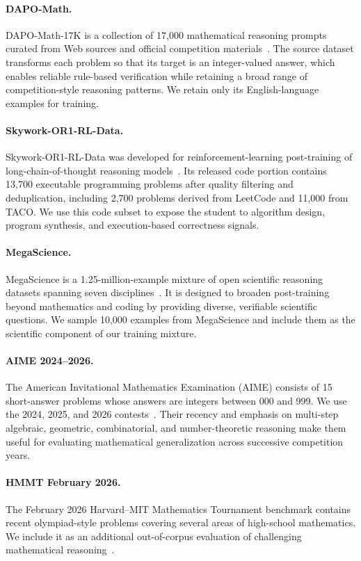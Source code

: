 \paragraph{DAPO-Math.}
DAPO-Math-17K is a collection of 17,000 mathematical reasoning prompts curated from Web sources and official competition materials~\citep{abs-2503-14476}. 
The source dataset transforms each problem so that its target is an integer-valued answer, which enables reliable rule-based verification while retaining a broad range of competition-style reasoning patterns. 
We retain only its English-language examples for training.

\paragraph{Skywork-OR1-RL-Data.}
Skywork-OR1-RL-Data was developed for reinforcement-learning post-training of long-chain-of-thought reasoning models~\citep{abs-2505-22312}.  
Its released code portion contains 13,700 executable programming problems after quality filtering and deduplication, including 2,700 problems derived from LeetCode and 11,000 from TACO\@. 
We use this code subset to expose the student to algorithm design, program synthesis, and execution-based correctness signals.

\paragraph{MegaScience.}
MegaScience is a 1.25-million-example mixture of open scientific reasoning datasets spanning seven disciplines~\citep{abs-2507-16812}. 
It is designed to broaden post-training beyond mathematics and coding by providing diverse, verifiable scientific questions. 
We sample 10,000 examples from MegaScience and include them as the scientific component of our training mixture.

\paragraph{AIME 2024--2026.}
The American Invitational Mathematics Examination (AIME) consists of 15 short-answer problems whose answers are integers between 000 and 999. 
We use the 2024, 2025, and 2026 contests~\citep{aime24,aime25,aime26}. 
Their recency and emphasis on multi-step algebraic, geometric, combinatorial, and number-theoretic reasoning make them useful for evaluating mathematical generalization across successive competition years.

\paragraph{HMMT February 2026.}
The February 2026 Harvard--MIT Mathematics Tournament benchmark contains recent olympiad-style problems covering several areas of high-school mathematics. 
We include it as an additional out-of-corpus evaluation of challenging mathematical reasoning~\citep{abs-2605-00674}.

